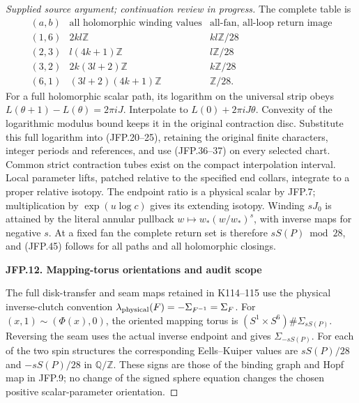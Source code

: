 \begin{proof}[Supplied source argument; continuation review in progress]
The complete table is
\[
\begin{array}{c|c|c}
(a,b)&\text{all holomorphic winding values}&
\text{all-fan, all-loop return image}\\\hline
(1,6)&2kl\mathbb Z&kl\mathbb Z/28\\
(2,3)&l(4k+1)\mathbb Z&l\mathbb Z/28\\
(3,2)&2k(3l+2)\mathbb Z&k\mathbb Z/28\\
(6,1)&(3l+2)(4k+1)\mathbb Z&\mathbb Z/28.
\end{array}
\tag{JFP.45}
\]
For a full holomorphic scalar path, its logarithm on the
universal strip obeys \(L(\theta+1)-L(\theta)=2\pi iJ\).
Interpolate to \(L(0)+2\pi iJ\theta\). Convexity of the
logarithmic modulus bound keeps it in the original contraction
disc. Substitute this full logarithm into (JFP.20--25), retaining
the original finite characters, integer periods and references,
and use (JFP.36--37) on every selected chart. Common strict
contraction tubes exist on the compact interpolation interval.
Local parameter lifts, patched relative to the specified end
collars, integrate to a proper relative isotopy. The endpoint
ratio is a physical scalar by JFP.7; multiplication by
\(\exp(u\log c)\) gives its extending isotopy. Winding
\(sJ_0\) is attained by the literal annular pullback
\(w\mapsto w_*(w/w_*)^s\), with inverse maps for negative
\(s\). At a fixed fan the complete return set is therefore
\(sS(P)\bmod28\), and (JFP.45) follows for all paths and
all holomorphic closings.

\par

\medskip\noindent\textbf{JFP.12. Mapping-torus orientations and audit scope}

\par\nobreak

The full disk-transfer and seam maps retained in K114--115 use
the physical inverse-clutch convention
\(\lambda_{\rm physical}(F)=-\Sigma_{F^{-1}}=\Sigma_F\).
For \((x,1)\sim(\Phi(x),0)\), the oriented mapping torus
is \((S^1\times S^6)\#\Sigma_{sS(P)}\). Reversing the
seam uses the actual inverse endpoint and gives
\(\Sigma_{-sS(P)}\). For each of the two spin structures
the corresponding Eells--Kuiper values are
\(sS(P)/28\) and \(-sS(P)/28\) in \(\mathbb Q/\mathbb Z\).
These signs are those of the binding graph and Hopf map in
JFP.9; no change of the signed sphere equation changes the
chosen positive scalar-parameter orientation.


\end{proof}
